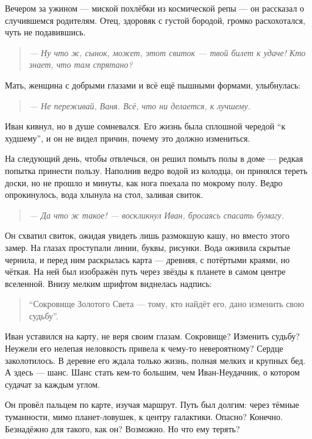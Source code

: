 \documentclass[12pt,a4paper]{book} %
\newenvironment{dialogue}{\begin{quote}\itshape}{\end{quote}}
\begin{document}
Вечером за ужином --- миской похлёбки из космической репы --- он рассказал о случившемся родителям. Отец, здоровяк с густой бородой, громко расхохотался, чуть не подавившись.

\begin{dialogue}
--- Ну что ж, сынок, может, этот свиток --- твой билет к удаче! Кто знает, что там спрятано?
\end{dialogue}

Мать, женщина с добрыми глазами и всё ещё пышными формами, улыбнулась:

\begin{dialogue}
--- Не переживай, Ваня. Всё, что ни делается, к лучшему.
\end{dialogue}

Иван кивнул, но в душе сомневался. Его жизнь была сплошной чередой ``к худшему'', и он не видел причин, почему это должно измениться.

На следующий день, чтобы отвлечься, он решил помыть полы в доме --- редкая попытка принести пользу. Наполнив ведро водой из колодца, он принялся тереть доски, но не прошло и минуты, как нога поехала по мокрому полу. Ведро опрокинулось, вода хлынула на стол, заливая свиток.

\begin{dialogue}
--- Да что ж такое! --- воскликнул Иван, бросаясь спасать бумагу.
\end{dialogue}

Он схватил свиток, ожидая увидеть лишь размокшую кашу, но вместо этого замер. На глазах проступали линии, буквы, рисунки. Вода оживила скрытые чернила, и перед ним раскрылась карта --- древняя, с потёртыми краями, но чёткая. На ней был изображён путь через звёзды к планете в самом центре вселенной. Внизу мелким шрифтом виднелась надпись:

\begin{quote}
``Сокровище Золотого Света --- тому, кто найдёт его, дано изменить свою судьбу''.
\end{quote}

Иван уставился на карту, не веря своим глазам. Сокровище? Изменить судьбу? Неужели его нелепая неловкость привела к чему-то невероятному? Сердце заколотилось. В деревне его ждала только жизнь, полная мелких и крупных бед. А здесь --- шанс. Шанс стать кем-то большим, чем Иван-Неудачник, о котором судачат за каждым углом.

Он провёл пальцем по карте, изучая маршрут. Путь был долгим: через тёмные туманности, мимо планет-ловушек, к центру галактики. Опасно? Конечно. Безнадёжно для такого, как он? Возможно. Но что ему терять?
\end{document}
